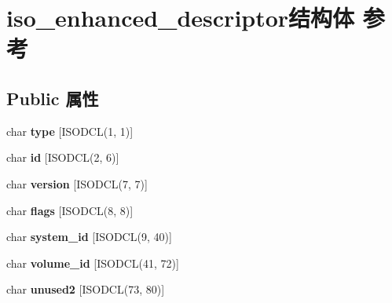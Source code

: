 \hypertarget{structiso__enhanced__descriptor}{}\section{iso\+\_\+enhanced\+\_\+descriptor结构体 参考}
\label{structiso__enhanced__descriptor}
\subsection*{Public 属性}
\begin{DoxyCompactItemize}
\item 
\mbox{\label{structiso__enhanced__descriptor_ae0e97ce558150a6dd193faa6dea53570}} 
char {\bfseries type} \mbox{[}I\+S\+O\+D\+CL(1, 1)\mbox{]}
\item 
\mbox{\label{structiso__enhanced__descriptor_a80fb1e5b8aa0b8b025163c7784d5e9a0}} 
char {\bfseries id} \mbox{[}I\+S\+O\+D\+CL(2, 6)\mbox{]}
\item 
\mbox{\label{structiso__enhanced__descriptor_aa0535d34bcc6da80d1487fadc3db07ba}} 
char {\bfseries version} \mbox{[}I\+S\+O\+D\+CL(7, 7)\mbox{]}
\item 
\mbox{\label{structiso__enhanced__descriptor_a39e70971af170acf11dcf22f51d6469d}} 
char {\bfseries flags} \mbox{[}I\+S\+O\+D\+CL(8, 8)\mbox{]}
\item 
\mbox{\label{structiso__enhanced__descriptor_abc4aad492f6293b71dcf927a592becc4}} 
char {\bfseries system\+\_\+id} \mbox{[}I\+S\+O\+D\+CL(9, 40)\mbox{]}
\item 
\mbox{\label{structiso__enhanced__descriptor_a07b088a18c494e69eb83536a75333aa5}} 
char {\bfseries volume\+\_\+id} \mbox{[}I\+S\+O\+D\+CL(41, 72)\mbox{]}
\item 
\mbox{\label{structiso__enhanced__descriptor_af116509ab3ec8bc8d5f192dfa45fedcc}} 
char {\bfseries unused2} \mbox{[}I\+S\+O\+D\+CL(73, 80)\mbox{]}
\item 
\mbox{\label{structiso__enhanced__descriptor_aa224c459db95aaaec630a4456ee40451}} 

\end{DoxyCompactItemize}
